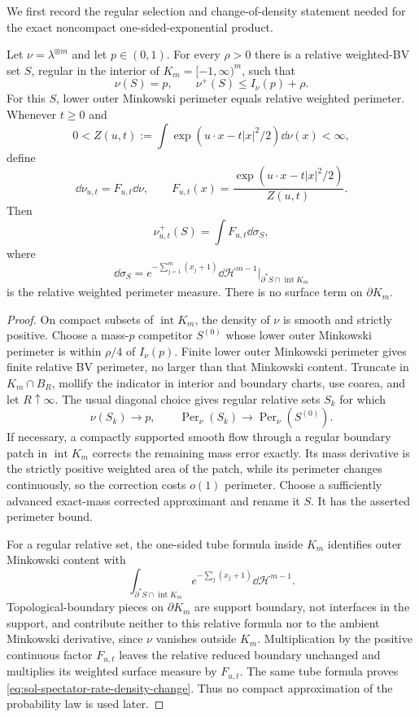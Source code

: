 \documentclass[../main.tex]{subfiles}
\begin{document}
We first record the regular selection and change-of-density statement needed for the exact
noncompact one-sided-exponential product.

\begin{lemma}
\label{lem:sol-spectator-rate-regularization}
Let $\nu=\lambda^{\otimes m}$ and let $p\in(0,1)$.  For every $\rho>0$ there is a relative
weighted-BV set $S$, regular in the interior of $K_m=[-1,\infty)^m$, such that
\[
  \nu(S)=p,
  \qquad
  \nu^+(S)\le I_\nu(p)+\rho.
\]
For this $S$, lower outer Minkowski perimeter equals relative weighted perimeter.  Whenever
$t\ge0$ and
\[
  0<Z(u,t):=\int\exp(u\cdot x-t|x|^2/2)\dd\nu(x)<\infty,
\]
define
\[
  \dd\nu_{u,t}=F_{u,t}\dd\nu,
  \qquad
  F_{u,t}(x)=\frac{\exp(u\cdot x-t|x|^2/2)}{Z(u,t)}.
\]
Then
\begin{equation}
  \nu_{u,t}^+(S)=\int F_{u,t}\dd\sigma_S,
  \label{eq:sol-spectator-rate-density-change}
\end{equation}
where
\[
  \dd\sigma_S=e^{-\sum_{j=1}^m(x_j+1)}
  \dd\mathcal H^{m-1}|_{\partial^*S\cap\operatorname{int}K_m}
\]
is the relative weighted perimeter measure.  There is no surface term on $\partial K_m$.
\end{lemma}

\begin{proof}
On compact subsets of $\operatorname{int}K_m$, the density of $\nu$ is smooth and strictly
positive.  Choose a mass-$p$ competitor $S^{(0)}$ whose lower outer Minkowski perimeter is
within $\rho/4$ of $I_\nu(p)$.  Finite lower outer Minkowski perimeter gives finite relative BV
perimeter, no larger than that Minkowski content.  Truncate in $K_m\cap B_R$, mollify the
indicator in interior and boundary charts, use coarea, and let $R\uparrow\infty$.  The usual
diagonal choice gives regular relative sets $S_k$ for which
\[
  \nu(S_k)\longrightarrow p,
  \qquad
  \operatorname{Per}_\nu(S_k)\longrightarrow
  \operatorname{Per}_\nu(S^{(0)}).
\]
If necessary, a compactly supported smooth flow through a regular boundary patch in
$\operatorname{int}K_m$ corrects the remaining mass error exactly.  Its mass derivative is the
strictly positive weighted area of the patch, while its perimeter changes continuously, so the
correction costs $o(1)$ perimeter.  Choose a sufficiently advanced exact-mass corrected
approximant and rename it $S$.  It has the asserted perimeter bound.

For a regular relative set, the one-sided tube formula inside $K_m$ identifies outer Minkowski
content with
\[
  \int_{\partial^*S\cap\operatorname{int}K_m}
       e^{-\sum_j(x_j+1)}\dd\mathcal H^{m-1}.
\]
Topological-boundary pieces on $\partial K_m$ are support boundary, not interfaces in the
support, and contribute neither to this relative formula nor to the ambient Minkowski
derivative, since $\nu$ vanishes outside $K_m$.  Multiplication by the positive continuous
factor $F_{u,t}$ leaves the relative reduced boundary unchanged and multiplies its weighted
surface measure by $F_{u,t}$.  The same tube formula proves
\eqref{eq:sol-spectator-rate-density-change}.  Thus no compact approximation of the probability
law is used later.
\end{proof}
\end{document}
